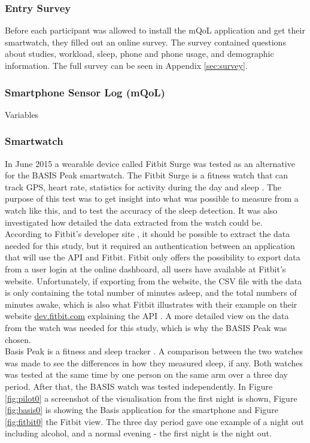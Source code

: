 \documentclass[12pt]{article} %
\begin{document}
\subsubsection{Entry Survey}
Before each participant was allowed to install the mQoL application and get their smartwatch, they filled out an online survey. The survey contained questions about studies, workload, sleep, phone and phone usage, and demographic information. The full survey can be seen in Appendix \ref{sec:survey}. 

\subsubsection{Smartphone Sensor Log (mQoL)}
Variables

\subsubsection{Smartwatch}
In June 2015 a wearable device called Fitbit Surge was tested as an alternative for the BASIS Peak smartwatch. The Fitbit Surge is a fitness watch that can track GPS, heart rate, statistics for activity during the day and sleep \cite{fitbit}. The purpose of this test was to get insight into what was possible to measure from a watch like this, and to test the accuracy of the sleep detection. It was also investigated how detailed the data extracted from the watch could be.  \\

According to Fitbit's developer site \cite{fitbit_dev}, it should be possible to extract the data needed for this study, but it required an authentication between an application that will use the API and Fitbit. Fitbit only offers the possibility to export data from a user login at the online dashboard, all users have available at Fitbit's website. Unfortunately, if exporting from the website, the CSV file with the data is only containing the total number of minutes asleep, and the total numbers of minutes awake, which is also what Fitbit illustrates with their example on their website \url{dev.fitbit.com} explaining the API \cite{fitbit_dev}. A more detailed view on the data from the watch was needed for this study, which is why the BASIS Peak was chosen.\\

Basis Peak is a fitness and sleep tracker \cite{basis}. A comparison between the two watches was made to see the differences in how they measured sleep, if any. Both watches was tested at the same time by one person on the same arm over a three day period. After that, the BASIS watch was tested independently. In Figure \ref{fig:pilot0} a screenshot of the visualisation from the first night is shown, Figure \ref{fig:basis0} is showing the Basis application for the smartphone and Figure \ref{fig:fitbit0} the Fitbit view. The three day period gave one example of a night out including alcohol, and a normal evening - the first night is the night out. 
\end{document}
